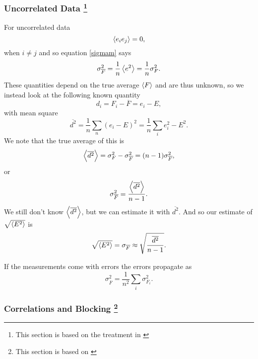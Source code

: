 \documentclass[a4paper,English,10pt]{article}
\newcommand{\be}{\begin{equation}}
\newcommand{\ee}{\end{equation}}
\newcommand{\f}{\frac}
\renewcommand{\bar}{\overline}
\renewcommand{\braket}{\Braket}
\begin{document}
\subsubsection[Uncorrelated Data]{Uncorrelated Data \footnote{This section is based on the treatment in \cite{errors}}}
For uncorrelated data
\be
 \braket{e_i e_j} = 0,
\ee
when $i\neq j$
and so equation \ref{sigmam} says
\be
\sigma^2_{\bar{F}} = \f{1}{n}\braket{e^2} = \f{1}{n}\sigma_F^2.
\ee
These quantities depend on the true average $\braket{F}$ and are thus unknown, so we instead look at the following known quantity
\be
d_i = F_i - \bar{F} = e_i - E, \label{residualdef}
\ee
with mean square
\be
\bar{d^2} = \f{1}{n}\sum_n(e_i - E)^2 = \f{1}{n}\sum_i e_i^2 - E^2.
\ee
We note that the true average of this is
\be
\braket{\bar{d^2}} = \sigma_F^2 - \sigma_{\bar{F}}^2 = (n-1)\sigma_{\bar{F}}^2,
\ee
or
\be
\sigma_{\bar{F}}^2 = \f{\braket{\bar{d^2}}}{n-1}.
\ee
We still don't know $\braket{\bar{d^2}}$, but we can estimate it with $\bar{d^2}$. And so our estimate of $\sqrt{\braket{E^2}}$ is
\be
\sqrt{\braket{E^2}} = \sigma_{\bar{F}} \approx \sqrt{\f{\bar{d^2}}{n-1}}.\label{errorest}
\ee

If the measurements come with errors the errors propagate as
\be
\sigma^2_{\bar{F}} = \f{1}{n^2}\sum_i\sigma_{F_i}^2.\label{errprop}
\ee

\subsubsection[Correlations and Blocking]{Correlations and Blocking \footnote {This section is based on \cite{block} } }
\end{document}
